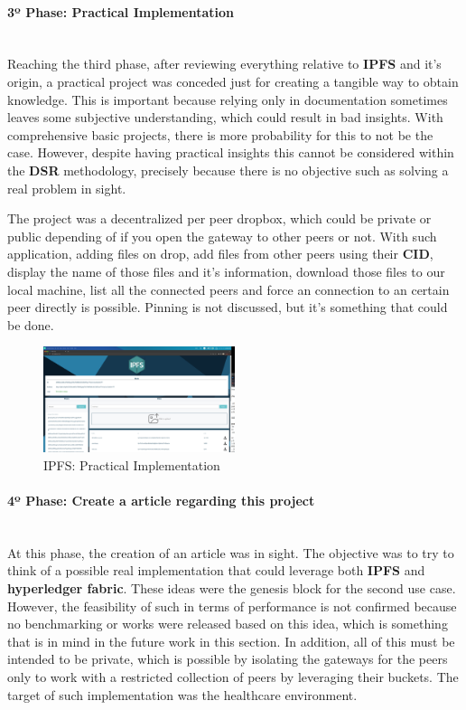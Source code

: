 \paragraph{3º Phase: Practical Implementation}\mbox{}\\
Reaching the third phase, after reviewing everything relative to \textbf{IPFS} and it's origin, a practical project was conceded just for creating a tangible way to obtain knowledge. This is important because relying only in documentation sometimes leaves some subjective understanding, which could result in bad insights. With comprehensive basic projects, there is more probability for this to not be the case. However, despite having practical insights this cannot be considered within the \textbf{DSR} methodology, precisely because there is no objective such as solving a real problem in sight.

The project was a decentralized per peer dropbox, which could be private or public depending of if you open the gateway to other peers or not. With such application, adding files on drop, add files from other peers using their \textbf{CID}, display the name of those files and it's information, download those files to our local machine, list all the connected peers and force an connection to an certain peer directly is possible. Pinning is not discussed, but it's something that could be done.

\begin{figure}[H]
    \centering
    \includegraphics[width=0.5\textwidth]{assets/use-case-1/ipfshow.png} %
    \caption{IPFS: Practical Implementation}
    \label{fig:sample-image} 
\end{figure}

\paragraph{4º Phase: Create a article regarding this project}\mbox{}\\
At this phase, the creation of an article was in sight. The objective was to try to think of a possible real implementation that could leverage both \textbf{IPFS} and \textbf{hyperledger fabric}. These ideas were the genesis block for the second use case. However, the feasibility of such in terms of performance is not confirmed because no benchmarking or works were released based on this idea, which is something that is in mind in the future work in this section. In addition, all of this must be intended to be private, which is possible by isolating the gateways for the peers only to work with a restricted collection of peers by leveraging their buckets. The target of such implementation was the healthcare environment.

